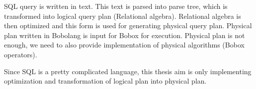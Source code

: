 SQL query is written in text. This text is parsed into parse tree, which is transformed into logical query plan (Relational algebra). Relational algebra is then optimized and this form is used for generating physical query plan. Physical plan written in Bobolang is input for Bobox for execution. Physical plan is not enough, we need to also provide implementation of physical algorithms (Bobox operators).

Since SQL is a pretty complicated language, this thesis aim is only implementing optimization and transformation of logical plan into physical plan.


